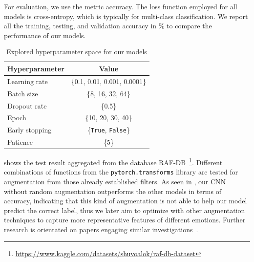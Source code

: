 For evaluation, we use the metric accuracy. 
The loss function employed for all models is cross-entropy, which is typically for multi-class classification. 
We report all the training, testing, and validation accuracy in \% to compare the performance of our models. 

\begin{table}%
  \centering
  \begin{tabular}{@{}lc@{}}
    \toprule
    Hyperparameter & Value \\
    \midrule
    Learning rate & \{0.1, 0.01, 0.001, 0.0001\}  \\
    Batch size & \{8, 16, 32, 64\} \\
    Dropout rate & \{0.5\} \\
    Epoch & \{10, 20, 30, 40\} \\
    Early stopping & \{\texttt{True}, \texttt{False}\} \\
    Patience & \{5\} \\
    \bottomrule
  \end{tabular}
  \caption{Explored hyperparameter space for our models}
  \label{tab:hyper}
\end{table}


 shows the test result aggregated from the database RAF-DB~\footnote{\url{https://www.kaggle.com/datasets/shuvoalok/raf-db-dataset}}. 
Different combinations of functions from the \texttt{pytorch.transforms} library are tested for augmentation from those already established filters. %
As seen in , 
our CNN without random augmentation outperforms the other models in terms of accuracy, 
indicating that this kind of augmentation is not able to help our model predict the correct label, 
thus we later aim to optimize with other augmentation techniques to capture more representative features of different emotions.
Further research is orientated on papers engaging similar investigations~\cite{ZeilerF14,li_reliable_2017,VermaMRMV23}.

